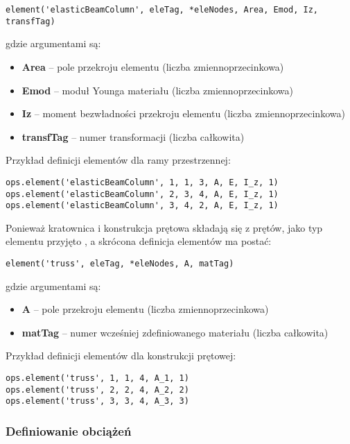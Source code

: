 \begin{lstlisting}
element('elasticBeamColumn', eleTag, *eleNodes, Area, Emod, Iz, transfTag)
\end{lstlisting}

gdzie argumentami są:
\begin{itemize}
    \item \textbf{Area} – pole przekroju elementu (liczba zmiennoprzecinkowa)
    \item \textbf{Emod} – moduł Younga materiału (liczba zmiennoprzecinkowa)
    \item \textbf{Iz} – moment bezwładności przekroju elementu (liczba zmiennoprzecinkowa)
    \item \textbf{transfTag} – numer transformacji (liczba całkowita)
\end{itemize}

Przykład definicji elementów dla ramy przestrzennej:

\begin{lstlisting}
ops.element('elasticBeamColumn', 1, 1, 3, A, E, I_z, 1)
ops.element('elasticBeamColumn', 2, 3, 4, A, E, I_z, 1)
ops.element('elasticBeamColumn', 3, 4, 2, A, E, I_z, 1)
\end{lstlisting}

Ponieważ kratownica i konstrukcja prętowa składają się z prętów, jako typ elementu przyjęto , a skrócona definicja elementów ma postać:

\begin{lstlisting}
element('truss', eleTag, *eleNodes, A, matTag)
\end{lstlisting}

gdzie argumentami są:
\begin{itemize}
    \item \textbf{A} – pole przekroju elementu (liczba zmiennoprzecinkowa)
    \item \textbf{matTag} – numer wcześniej zdefiniowanego materiału (liczba całkowita)
\end{itemize}

Przykład definicji elementów dla konstrukcji prętowej:

\begin{lstlisting}
ops.element('truss', 1, 1, 4, A_1, 1)
ops.element('truss', 2, 2, 4, A_2, 2)
ops.element('truss', 3, 3, 4, A_3, 3)
\end{lstlisting}

\subsubsection{Definiowanie obciążeń}

